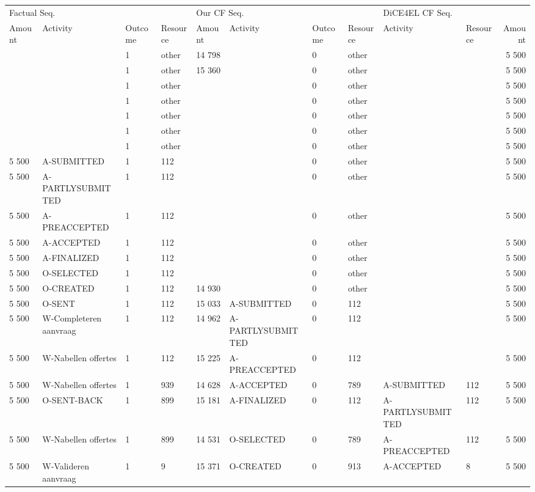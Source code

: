 \begin{tabular}{llllllllllr}
\toprule
\multicolumn{4}{l}{Factual Seq.} & \multicolumn{4}{l}{Our CF Seq.} & \multicolumn{3}{l}{DiCE4EL CF Seq.} \\
Amount & Activity & Outcome & Resource & Amount & Activity & Outcome & Resource & Activity & Resource & Amount \\
\midrule
 &  & 1 & other & 14 798 &  & 0 & other &  &  & 5 500 \\
 &  & 1 & other & 15 360 &  & 0 & other &  &  & 5 500 \\
 &  & 1 & other &  &  & 0 & other &  &  & 5 500 \\
 &  & 1 & other &  &  & 0 & other &  &  & 5 500 \\
 &  & 1 & other &  &  & 0 & other &  &  & 5 500 \\
 &  & 1 & other &  &  & 0 & other &  &  & 5 500 \\
 &  & 1 & other &  &  & 0 & other &  &  & 5 500 \\
5 500 & A-SUBMITTED & 1 & 112 &  &  & 0 & other &  &  & 5 500 \\
5 500 & A-PARTLYSUBMITTED & 1 & 112 &  &  & 0 & other &  &  & 5 500 \\
5 500 & A-PREACCEPTED & 1 & 112 &  &  & 0 & other &  &  & 5 500 \\
5 500 & A-ACCEPTED & 1 & 112 &  &  & 0 & other &  &  & 5 500 \\
5 500 & A-FINALIZED & 1 & 112 &  &  & 0 & other &  &  & 5 500 \\
5 500 & O-SELECTED & 1 & 112 &  &  & 0 & other &  &  & 5 500 \\
5 500 & O-CREATED & 1 & 112 & 14 930 &  & 0 & other &  &  & 5 500 \\
5 500 & O-SENT & 1 & 112 & 15 033 & A-SUBMITTED & 0 & 112 &  &  & 5 500 \\
5 500 & W-Completeren aanvraag & 1 & 112 & 14 962 & A-PARTLYSUBMITTED & 0 & 112 &  &  & 5 500 \\
5 500 & W-Nabellen offertes & 1 & 112 & 15 225 & A-PREACCEPTED & 0 & 112 &  &  & 5 500 \\
5 500 & W-Nabellen offertes & 1 & 939 & 14 628 & A-ACCEPTED & 0 & 789 & A-SUBMITTED & 112 & 5 500 \\
5 500 & O-SENT-BACK & 1 & 899 & 15 181 & A-FINALIZED & 0 & 112 & A-PARTLYSUBMITTED & 112 & 5 500 \\
5 500 & W-Nabellen offertes & 1 & 899 & 14 531 & O-SELECTED & 0 & 789 & A-PREACCEPTED & 112 & 5 500 \\
5 500 & W-Valideren aanvraag & 1 & 9 & 15 371 & O-CREATED & 0 & 913 & A-ACCEPTED & 8 & 5 500 \\

\end{tabular}
